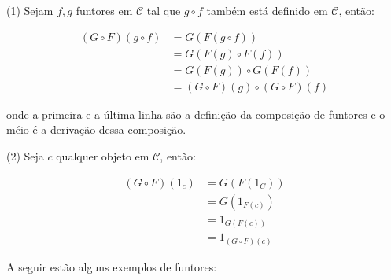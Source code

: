 \documentclass[../main.tex]{subfiles}
\begin{document}
(1) Sejam $f, g$ funtores em $\mathcal{C}$ tal que $g \circ f$ também está definido em $\mathcal{C}$, então: 

\begin{equation*}
    \begin{split}
        (G \circ F) (g \circ f) & = G(F(g \circ f))
                                     \\ & = G(F(g) \circ F(f))
                                     \\ & = G(F(g)) \circ G(F(f))
                                     \\ & = (G \circ F) (g) \circ (G \circ F) (f)
    \end{split}
\end{equation*}

onde a primeira e a última linha são a definição da composição de funtores e o méio é a derivação dessa composição.

(2) Seja $c$ qualquer objeto em $\mathcal{C}$, então:

\begin{equation*}
    \begin{split}
        (G \circ F) (1_c) & = G(F(1_C))
                        \\ & = G(1_{F(c)})
                        \\ & = 1_{G(F(c))}
                        \\ & = 1_{(G \circ F)(c)}
    \end{split}
\end{equation*}

A seguir estão alguns exemplos de funtores:
\end{document}
